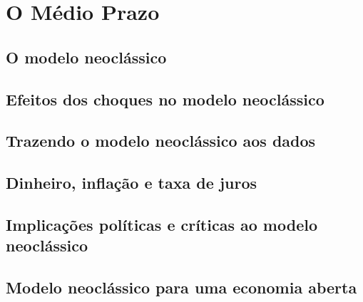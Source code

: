 \documentclass[a4paper,11pt]{book}
\theoremstyle{definition}
\begin{document}
\part{O Médio Prazo}

\chapter{O modelo neoclássico}

\chapter{Efeitos dos choques no modelo neoclássico}

\chapter{Trazendo o modelo neoclássico aos dados}

\chapter{Dinheiro, inflação e taxa de juros}

\chapter{Implicações políticas e críticas ao modelo neoclássico}

\chapter{Modelo neoclássico para uma economia aberta}
\end{document}
